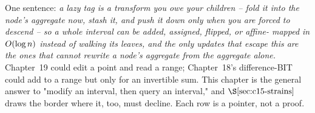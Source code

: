 

One sentence: \emph{a lazy tag is a transform you owe your children -- fold it into
the node's aggregate now, stash it, and push it down only when you are forced to
descend -- so a \emph{whole interval} can be added, assigned, flipped, or affine-
mapped in \(O(\log n)\) instead of walking its leaves, and the only updates that
escape this are the ones that cannot rewrite a node's aggregate from the aggregate
alone.} Chapter~19 could edit a point and read a range; Chapter~18's difference-BIT
could add to a range but only for an invertible sum. This chapter is the general
answer to "modify an interval, then query an interval," and \(\secref{c15-strains}\)
draws the border where it, too, must decline. Each row is a pointer, not a proof.

